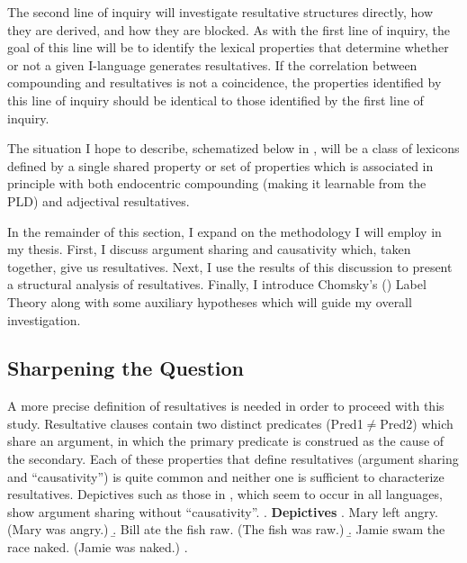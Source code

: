 \documentclass[letterpaper,12pt]{article}
\newcommand{\figex}{\refstepcounter{ExNo}\theExNo\hspace{\Exlabelsep}}
\begin{document}
The second line of inquiry will investigate resultative structures directly, how they are derived, and how they are blocked.
As with the first line of inquiry, the goal of this line will be to identify the lexical properties that determine whether or not a given I-language generates resultatives.
If the correlation between compounding and resultatives is not a coincidence, the properties identified by this line of inquiry should be identical to those identified by the first line of inquiry.

The situation I hope to describe, schematized below in \Next,  will be a class of lexicons defined by a single shared property or set of properties which is associated in principle with both endocentric compounding (making it learnable from the PLD) and adjectival resultatives. 
\begin{figure}[h]
  \figex
  \label{fig:ParameterModel}
\end{figure}

In the remainder of this section, I expand on the methodology I will employ in my thesis.
First, I discuss argument sharing and causativity which, taken together, give us resultatives.
Next, I use the results of this discussion to present a structural analysis of resultatives.
Finally, I introduce Chomsky's (\citeyear{chomsky2013problems,chomsky2015problems}) Label Theory along with some auxiliary hypotheses which will guide my overall investigation.

\subsection{Sharpening the Question}\label{sec:result analysis}
A more precise definition of resultatives is needed in order to proceed with this study.
Resultative clauses  contain two distinct predicates (Pred1$\neq$Pred2) which share an argument, in which the primary predicate is construed as the cause of the secondary.
Each of these properties that define resultatives (argument sharing and ``causativity'') is quite common and neither one is sufficient to characterize resultatives.
Depictives such as those in \Next, which seem to occur in all languages, show argument sharing without ``causativity''.
\ex. \textbf{Depictives}
\a. Mary left angry. (Mary was angry.)
\b. Bill ate the fish raw. (The fish was raw.)
\b. Jamie swam the race naked. (Jamie was naked.)
\z.
\end{document}
